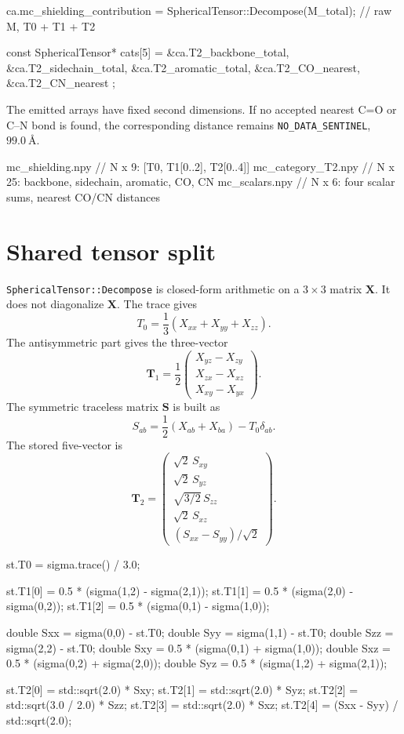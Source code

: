 \documentclass[11pt]{article}
\newcommand{\code}[1]{\texttt{#1}}
\begin{document}
\begin{codebox}
ca.mc_shielding_contribution =
    SphericalTensor::Decompose(M_total);     // raw M, T0 + T1 + T2

const SphericalTensor* cats[5] = {
    &ca.T2_backbone_total, &ca.T2_sidechain_total,
    &ca.T2_aromatic_total, &ca.T2_CO_nearest, &ca.T2_CN_nearest
};
\end{codebox}

The emitted arrays have fixed second dimensions. If no accepted nearest C=O
or C--N bond is found, the corresponding distance remains
\code{NO\_DATA\_SENTINEL}, \(\SI{99.0}{\angstrom}\).

\begin{codebox}
mc_shielding.npy    // N x 9:  [T0, T1[0..2], T2[0..4]]
mc_category_T2.npy  // N x 25: backbone, sidechain, aromatic, CO, CN
mc_scalars.npy      // N x 6:  four scalar sums, nearest CO/CN distances
\end{codebox}

\section{Shared tensor split}

\code{SphericalTensor::Decompose} is closed-form arithmetic on a \(3\times3\)
matrix \(\bm X\). It does not diagonalize \(\bm X\). The trace gives
\[
  T_0 = \frac{1}{3}(X_{xx}+X_{yy}+X_{zz}).
\]
The antisymmetric part gives the three-vector
\[
  \bm T_1 = \frac12
  \begin{pmatrix}
    X_{yz}-X_{zy}\\
    X_{zx}-X_{xz}\\
    X_{xy}-X_{yx}
  \end{pmatrix}.
\]
The symmetric traceless matrix \(\bm S\) is built as
\[
  S_{ab}=\frac12(X_{ab}+X_{ba})-T_0\delta_{ab}.
\]
The stored five-vector is
\[
  \bm T_2 =
  \begin{pmatrix}
    \sqrt2\,S_{xy}\\
    \sqrt2\,S_{yz}\\
    \sqrt{3/2}\,S_{zz}\\
    \sqrt2\,S_{xz}\\
    (S_{xx}-S_{yy})/\sqrt2
  \end{pmatrix}.
\]

\begin{codebox}
st.T0 = sigma.trace() / 3.0;

st.T1[0] = 0.5 * (sigma(1,2) - sigma(2,1));
st.T1[1] = 0.5 * (sigma(2,0) - sigma(0,2));
st.T1[2] = 0.5 * (sigma(0,1) - sigma(1,0));

double Sxx = sigma(0,0) - st.T0;
double Syy = sigma(1,1) - st.T0;
double Szz = sigma(2,2) - st.T0;
double Sxy = 0.5 * (sigma(0,1) + sigma(1,0));
double Sxz = 0.5 * (sigma(0,2) + sigma(2,0));
double Syz = 0.5 * (sigma(1,2) + sigma(2,1));

st.T2[0] = std::sqrt(2.0) * Sxy;
st.T2[1] = std::sqrt(2.0) * Syz;
st.T2[2] = std::sqrt(3.0 / 2.0) * Szz;
st.T2[3] = std::sqrt(2.0) * Sxz;
st.T2[4] = (Sxx - Syy) / std::sqrt(2.0);
\end{codebox}
\end{document}
